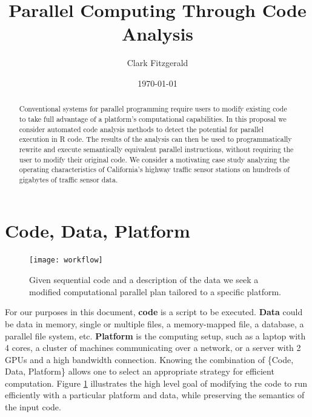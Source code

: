 \documentclass[12pt]{article}
\begin{document}
\title{Parallel Computing Through Code Analysis}
\date{\today}
\author{Clark Fitzgerald}
\maketitle

\begin{abstract}


    Conventional systems for parallel programming require users to modify
    existing code to take full advantage of a platform's computational
    capabilities. In this proposal we consider automated code analysis
    methods to detect the potential for parallel execution in R code. The results of
    the analysis can then be used to programmatically rewrite and execute
    semantically equivalent parallel instructions, without requiring the
    user to modify their original code.  We consider a motivating case
    study analyzing the operating characteristics of California's highway
    traffic sensor stations on hundreds of gigabytes of traffic sensor
    data.

\end{abstract}

\section{Code, Data, Platform}

\begin{figure}
\centering
\texttt{[image: workflow]}
\caption{Given sequential code and a description of the data we seek
    a modified computational parallel plan tailored to a specific platform.}
\label{fig:workflow}
\end{figure}

For our purposes in this document, \textbf{code} is a script to be
executed.  \textbf{Data} could be data in memory, single or multiple files,
a memory-mapped file, a database, a parallel file system, etc.
\textbf{Platform} is the computing setup, such as a laptop with 4 cores, a
cluster of machines communicating over a network, or a server with 2 GPUs
and a high bandwidth connection. Knowing the combination of \{Code, Data,
Platform\} allows one to select an appropriate strategy for efficient
computation.  Figure \ref{fig:workflow} illustrates the high level goal of
modifying the code to run efficiently with a particular platform and data,
while preserving the semantics of the input code.
\end{document}
